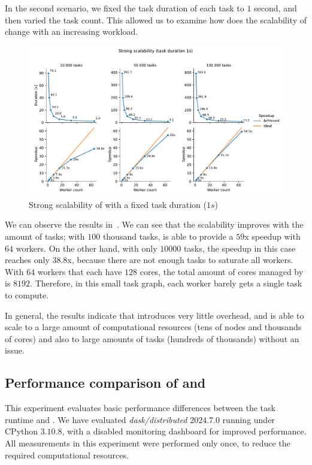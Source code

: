 In the second scenario, we fixed the task duration of each task to $1$ second,
and then varied the task count. This allowed us to examine how does the scalability of
\hyperqueue{} change with an increasing workload.

\begin{figure}[h]
	\centering
	\includegraphics[width=\textwidth]{imgs/hq/charts/scalability-fixed-task-duration}
	\caption{Strong scalability of \hyperqueue{} with a fixed task duration ($1s$)}
	\label{fig:hq-scalability-fixed-task-duration}
\end{figure}

We can observe the results in~. We can see that the scalability improves
with the amount of tasks; with $100$ thousand tasks, \hyperqueue{} is
able to provide a $59$x speedup with $64$ workers. On the other
hand, with only $10000$ tasks, the speedup in this case reaches only
$38.8$x, because there are not enough tasks to saturate all workers. With
$64$ workers that each have $128$ cores, the total amount of
cores managed by \hq{} is $8192$. Therefore, in this small task
graph, each worker barely gets a single task to compute.

In general, the results indicate that \hyperqueue{} introduces very little overhead, and
is able to scale to a large amount of computational resources (tens of nodes and thousands of
cores) and also to large amounts of tasks (hundreds of thousands) without an issue.

\subsection{Performance comparison of \dask{} and \hq{}}
\label{sec:hq-exp-dask}
This experiment evaluates basic performance differences between the \dask{} task
runtime and \hyperqueue{}. We have evaluated \emph{dask/distributed}
$2024.7.0$ running under CPython $3.10.8$, with a disabled monitoring
dashboard for improved performance. All measurements in this experiment were performed only once,
to reduce the required computational resources.

